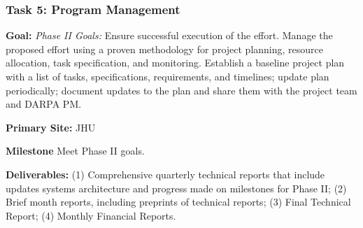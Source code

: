 
\subsubsection{Task 5: Program Management}
\begin{compactitem}
\item \textbf{Goal:} \emph{Phase II Goals:} Ensure successful execution of the effort. Manage the proposed effort using a proven methodology for project planning, resource allocation, task specification, and monitoring. Establish a baseline project plan with a list of tasks, specifications, requirements, and timelines; update plan periodically; document updates to the plan and share them with the project team and DARPA PM.
\item \textbf{Primary Site:} JHU
\item \textbf{Milestone} Meet Phase II goals.
\item \textbf{Deliverables:} 
(1) Comprehensive quarterly technical reports that include updates systems architecture and progress made on milestones for Phase II;
(2) Brief month reports, including preprints of technical reports;
(3) Final Technical Report;
(4) Monthly Financial Reports.
\end{compactitem}


